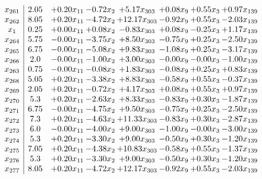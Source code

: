 \documentclass[8pt]{article}
\begin{document}
\[\begin{array}{c| c c@{\hskip 2pt} c@{\hskip 2pt} c@{\hskip 2pt} c@{\hskip 2pt} c@{\hskip 2pt} c@{\hskip 2pt} }
 x_{261}   &  2.05 & +  0.20 x_{11} & -0.72 x_{2} & +  5.17 x_{303} & +  0.08 x_{9} & +  0.55 x_{3} & +  0.97 x_{139}\\
 x_{262}   &  8.05 & +  0.20 x_{11} & -4.72 x_{2} & + 12.17 x_{303} & -0.92 x_{9} & +  0.55 x_{3} & -2.03 x_{139}\\
 x_{1}   &  0.25 & +  0.00 x_{11} & +  0.08 x_{2} & -0.83 x_{303} & +  0.08 x_{9} & -0.25 x_{3} & +  1.17 x_{139}\\
 x_{264}   &  5.75 & -0.00 x_{11} & -3.75 x_{2} & +  8.50 x_{303} & -0.75 x_{9} & +  0.25 x_{3} & -2.50 x_{139}\\
 x_{265}   &  6.75 & -0.00 x_{11} & -5.08 x_{2} & +  9.83 x_{303} & -1.08 x_{9} & +  0.25 x_{3} & -3.17 x_{139}\\
 x_{266}   &  2.0 & -0.00 x_{11} & -1.00 x_{2} & +  3.00 x_{303} & -0.00 x_{9} & -0.00 x_{3} & -1.00 x_{139}\\
 x_{263}   &  0.75 & -0.00 x_{11} & -0.08 x_{2} & +  1.83 x_{303} & -0.08 x_{9} & +  0.25 x_{3} & +  0.83 x_{139}\\
 x_{268}   &  5.05 & +  0.20 x_{11} & -3.38 x_{2} & +  8.83 x_{303} & -0.58 x_{9} & +  0.55 x_{3} & -0.37 x_{139}\\
 x_{269}   &  2.05 & +  0.20 x_{11} & -0.72 x_{2} & +  4.17 x_{303} & +  0.08 x_{9} & +  0.55 x_{3} & +  0.97 x_{139}\\
 x_{270}   &  5.3 & +  0.20 x_{11} & -2.63 x_{2} & +  8.33 x_{303} & -0.83 x_{9} & +  0.30 x_{3} & -1.87 x_{139}\\
 x_{271}   &  6.75 & -0.00 x_{11} & -4.75 x_{2} & +  9.50 x_{303} & -0.75 x_{9} & +  0.25 x_{3} & -2.50 x_{139}\\
 x_{272}   &  7.3 & +  0.20 x_{11} & -4.63 x_{2} & + 11.33 x_{303} & -0.83 x_{9} & +  0.30 x_{3} & -2.87 x_{139}\\
 x_{273}   &  6.0 & -0.00 x_{11} & -4.00 x_{2} & +  9.00 x_{303} & -1.00 x_{9} & -0.00 x_{3} & -3.00 x_{139}\\
 x_{274}   &  5.3 & +  0.20 x_{11} & -3.30 x_{2} & +  9.00 x_{303} & -0.50 x_{9} & +  0.30 x_{3} & -1.20 x_{139}\\
 x_{275}   &  7.05 & +  0.20 x_{11} & -4.38 x_{2} & + 10.83 x_{303} & -0.58 x_{9} & +  0.55 x_{3} & -1.37 x_{139}\\
 x_{276}   &  5.3 & +  0.20 x_{11} & -3.30 x_{2} & +  9.00 x_{303} & -0.50 x_{9} & +  0.30 x_{3} & -1.20 x_{139}\\
 x_{277}   &  8.05 & +  0.20 x_{11} & -4.72 x_{2} & + 12.17 x_{303} & -0.92 x_{9} & +  0.55 x_{3} & -2.03 x_{139}\\

\end{array}\]
\end{document}
